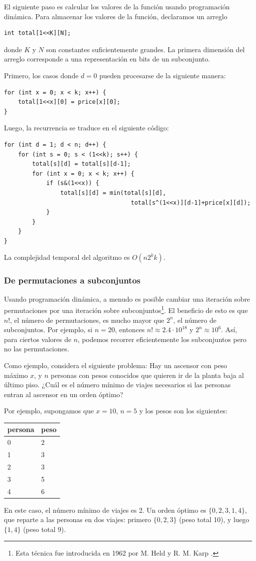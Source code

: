El siguiente paso es calcular los valores de la función
usando programación dinámica.
Para almacenar los valores de la función, declaramos un arreglo
\begin{lstlisting}
int total[1<<K][N];
\end{lstlisting}
donde $K$ y $N$ son constantes suficientemente grandes.
La primera dimensión del arreglo corresponde a una
representación en bits de un subconjunto.

Primero, los casos donde $d=0$ pueden procesarse de la siguiente manera:
\begin{lstlisting}
for (int x = 0; x < k; x++) {
    total[1<<x][0] = price[x][0];
}
\end{lstlisting}
Luego, la recurrencia se traduce en el siguiente código:
\begin{lstlisting}
for (int d = 1; d < n; d++) {
    for (int s = 0; s < (1<<k); s++) {
        total[s][d] = total[s][d-1];
        for (int x = 0; x < k; x++) {
            if (s&(1<<x)) {
                total[s][d] = min(total[s][d],
                                    total[s^(1<<x)][d-1]+price[x][d]);
            }
        }
    }
}
\end{lstlisting}
La complejidad temporal del algoritmo es $O(n 2^k k)$.

\subsubsection{De permutaciones a subconjuntos}

Usando programación dinámica, a menudo es posible
cambiar una iteración sobre permutaciones por
una iteración sobre subconjuntos\footnote{Esta técnica fue introducida en 1962
por M. Held y R. M. Karp \cite{hel62}.}.
El beneficio de esto es que
$n!$, el número de permutaciones,
es mucho mayor que $2^n$, el número de subconjuntos.
Por ejemplo, si $n=20$, entonces
$n! \approx 2.4 \cdot 10^{18}$ y $2^n \approx 10^6$.
Así, para ciertos valores de $n$,
podemos recorrer eficientemente los subconjuntos pero no las permutaciones.

Como ejemplo, considera el siguiente problema:
Hay un ascensor con peso máximo $x$,
y $n$ personas con pesos conocidos
que quieren ir de la planta baja
al último piso.
¿Cuál es el número mínimo de viajes necesarios
si las personas entran al ascensor en un orden óptimo?

Por ejemplo, supongamos que $x=10$, $n=5$
y los pesos son los siguientes:
\begin{center}
\begin{tabular}{ll}
persona & peso \\
\hline
0 & 2 \\
1 & 3 \\
2 & 3 \\
3 & 5 \\
4 & 6 \\
\end{tabular}
\end{center}
En este caso, el número mínimo de viajes es 2.
Un orden óptimo es $\{0,2,3,1,4\}$,
que reparte a las personas en dos viajes:
primero $\{0,2,3\}$ (peso total 10),
y luego $\{1,4\}$ (peso total 9).

